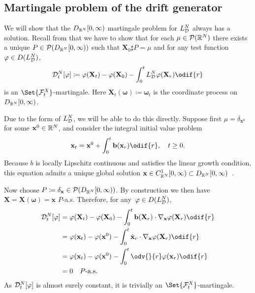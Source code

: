 \subsection{Martingale problem of the drift generator}

We will show that the \(D_{\mathbb{R}^N}[0,\infty)\) martingale problem for \(L_{\mathcal{D}}^N\) always has a solution.   %
Recall from  that we have to show that for each \(\mu \in \mathcal{P}(\mathbb{R}^N)\) there exists a unique \(P \in \mathcal{P}(D_{\mathbb{R}^N}[0,\infty))\) such that \( \bm{X}_0 \sharp P = \mu \) and for any test function \(\varphi \in D(L_{\mathcal{D}}^N)\),
\begin{equation}
  \cD_t^{N}[\varphi]
  \coloneqq \varphi(\bm{X}_t) - \varphi(\bm{X}_0) - \int_0^t L_{\cD}^{N} \varphi(\bm{X}_r) \odif{r}
\end{equation}
is an \(\Set{\cF_t^X}\)-martingale.
Here \(\bm{X}_t(\bm{\omega}) \coloneqq \bm{\omega}_t\) is the coordinate process on \(D_{\mathbb{R}^N}[0,\infty)\).

Due to the form of \(L_{\mathcal{D}}^N\), we will be able to do this directly.
Suppose first \(\mu = \delta_{\bm{x}^0}\) for some \(\mathbf{x}^0 \in \mathbb{R}^N\), and consider the integral initial value problem
\begin{equation}
  \bm{x}_t = \bm{x}^0 + \int_0^t \bm{b}(\bm{x}_r) \odif{r}, \quad t \geq 0.
\end{equation}
Because \(b\) is locally Lipschitz continuous and satisfies the linear growth condition, this equation admits a unique global solution \(\mathbf{x} \in C^1_{\mathbb{R}^N}[0,\infty) \subset D_{\mathbb{R}^N}[0,\infty)\)~\cite{ode_result}.

Now choose \(P \coloneqq \delta_{\mathbf{x}} \in \mathcal{P}(D_{\mathbb{R}^N}[0,\infty))\).
By construction we then have \(\bm{X} = \bm{X}(\bm{\omega}) = \bm{x}\) \(P\)-a.s.
Therefore, for any~\(\varphi \in D(L_{\mathcal{D}}^N)\),
\begin{equation}
  \begin{split}
    \cD_t^{N}[\varphi] & = \varphi(\bm{X}_t) - \varphi(\bm{X}_0) - \int_0^t \bm{b}(\bm{X}_r) \cdot \nabla_{\bm{x}} \varphi(\bm{X}_r) \odif{r} \\
                       & = \varphi(\bm{x}_t) - \varphi(\bm{x}^0) - \int_0^t \dot{\bm{x}}_r \cdot \nabla_{\bm{x}} \varphi(\bm{X}_r) \odif{r}   \\
                       & = \varphi(\bm{x}_t) - \varphi(\bm{x}^0) - \int_0^t \odv{}{r} \varphi(\bm{x}_r) \odif{r}                              \\
                       & = 0 \quad P\text{-a.s.}
  \end{split}
\end{equation}
As \(\mathcal{D}_t^{N}[\varphi]\) is almost surely constant, it is trivially an \(\Set{\cF_t^X}\)-martingale.


